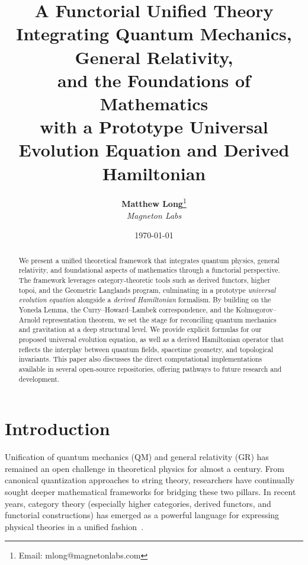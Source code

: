 \documentclass[11pt]{article}
\title{\textbf{A Functorial Unified Theory Integrating Quantum Mechanics, General Relativity,\\
and the Foundations of Mathematics\\
\large with a Prototype Universal Evolution Equation and Derived Hamiltonian}}
\author{
  \textbf{Matthew Long}\thanks{Email: mlong@magnetonlabs.com} \\
  \textit{Magneton Labs}
}
\date{\today}
\begin{document}
\maketitle

\begin{abstract}
We present a unified theoretical framework that integrates quantum physics, general relativity, and foundational aspects of mathematics through a functorial perspective. The framework leverages category-theoretic tools such as derived functors, higher topoi, and the Geometric Langlands program, culminating in a prototype \emph{universal evolution equation} alongside a \emph{derived Hamiltonian} formalism. By building on the Yoneda Lemma, the Curry--Howard--Lambek correspondence, and the Kolmogorov--Arnold representation theorem, we set the stage for reconciling quantum mechanics and gravitation at a deep structural level. We provide explicit formulas for our proposed universal evolution equation, as well as a derived Hamiltonian operator that reflects the interplay between quantum fields, spacetime geometry, and topological invariants. This paper also discusses the direct computational implementations available in several open-source repositories, offering pathways to future research and development. 
\end{abstract}

\tableofcontents

\section{Introduction}
\label{sec:intro}

Unification of quantum mechanics (QM) and general relativity (GR) has remained an open challenge in theoretical physics for almost a century. From canonical quantization approaches to string theory, researchers have continually sought deeper mathematical frameworks for bridging these two pillars. In recent years, category theory (especially higher categories, derived functors, and functorial constructions) has emerged as a powerful language for expressing physical theories in a unified fashion~\cite{MacLane, Grothendieck, BaezDolan}.
\end{document}
